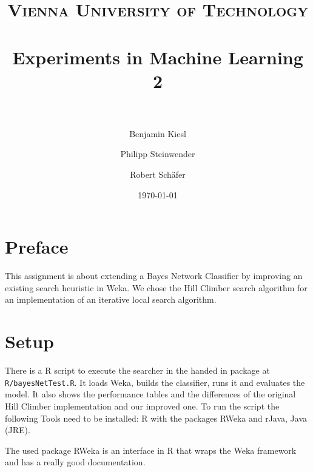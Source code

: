 \documentclass[paper=a4, fontsize=11pt]{scrartcl} %
\title{ 
\normalfont \normalsize 
\textsc{Vienna University of Technology} \\ [25pt] %
\horrule{0.5pt} \\[0.4cm] %
\huge Experiments in Machine Learning 2 \\ %
\horrule{2pt} \\[0.5cm] %
}
\author{Benjamin Kiesl \and Philipp Steinwender \and Robert Sch\"{a}fer} %
\date{\normalsize\today} %
\numberwithin{equation}{section} %
\numberwithin{figure}{section} %
\numberwithin{table}{section} %
\begin{document}
\maketitle %


\tableofcontents


%
%
%
\section{Preface}

This assignment is about extending a Bayes Network Classifier by improving an existing search heuristic in Weka. We chose the Hill Climber search algorithm for an implementation of an iterative local search algorithm.

%
%
%
\section{Setup}

There is a R script to execute the searcher in the handed in package at \texttt{R/bayesNetTest.R}. It loads Weka, builds the classifier, runs it and evaluates the model. It also shows the performance tables and the differences of the original Hill Climber implementation and our improved one. To run the script the following Tools need to be installed: R with the packages RWeka and rJava, Java (JRE).

The used package RWeka is an interface in R that wraps the Weka framework and has a really good documentation.

%
%
%
%
%
%
\end{document}
